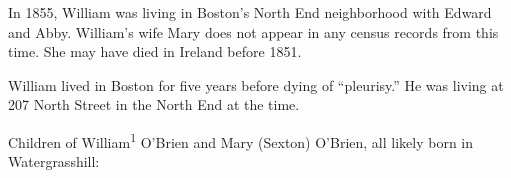 In 1855, William was living in Boston's North End neighborhood with Edward and Abby.\cite{Census1855William:3,Wards:1} William's wife Mary does not appear in any census records from this time. She may have died in Ireland before 1851.

William lived in Boston for five years before dying of ``pleurisy.'' He was living at 207 North Street in the North End at the time.\cite{William1OBrienDeath:2}

\begin{KidsIntro}
	Children of William\textsuperscript{1} O'Brien and Mary (Sexton) O'Brien, all likely born in Watergrasshill:
\end{KidsIntro}

